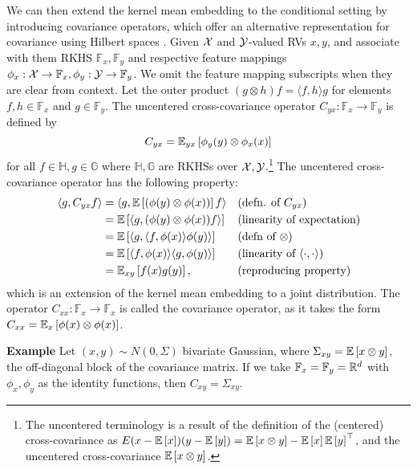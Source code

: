 \documentclass{article}
\begin{document}
We can then extend the kernel mean embedding to the conditional setting
by introducing covariance operators, which offer an alternative
representation for covariance using Hilbert spaces \citep{baker1970,baker1973}.
Given $\mathcal{X}$ and $\mathcal{Y}$-valued RVs $x,y$, and associate with them
RKHS $\mathbb{F}_x,\mathbb{F}_y$ and respective feature mappings
$\phi_x:\mathcal{X}\to\mathbb{F}_x,\phi_y:\mathcal{Y}\to\mathbb{F}_y$.
We omit the feature mapping subscripts when they are clear from context.
Let the outer product $(g \otimes h)f = \langle f,h\rangle g$ for elements
$f,h\in\mathbb{F}_x$ and $g\in\mathbb{F}_y$.
The uncentered cross-covariance operator $C_{yx}: \mathbb{F}_x\to\mathbb{F}_y$ is defined by
\begin{equation}
    \label{eqn:xcov}
    C_{yx} = \mathbb{E}_{yx}\left[\phi_y(y)\otimes\phi_x(x)\right]
\end{equation}
for all $f\in\mathbb{H},g\in\mathbb{G}$ where $\mathbb{H},\mathbb{G}$ are
RKHSs over $\mathcal{X},\mathcal{Y}$.\footnote{
The uncentered terminology is a result of the definition of the (centered) cross-covariance
as $E{(x - \mathbb{E}\left[x\right])(y - \mathbb{E}\left[y\right])} = \mathbb{E}\left[x\otimes y\right] - \mathbb{E}\left[x\right]\mathbb{E}\left[y\right]^\top$,
and the uncentered cross-covariance $\mathbb{E}\left[x\otimes y\right]$.
}
The uncentered cross-covariance operator has the following property:
\begin{equation}
    \label{eqn:xcove}
    \begin{aligned}
    \langle g, C_{yx}f\rangle
    &= \langle g, \mathbb{E}\left[(\phi(y)\otimes\phi(x))\right]f\rangle && \text{(defn. of }C_{yx})\\
    &= \mathbb{E}\left[\langle g, (\phi(y)\otimes\phi(x))f\rangle\right] && \text{(linearity of expectation)}\\
    &= \mathbb{E}\left[\langle g, \langle f, \phi(x)\rangle \phi(y)\rangle\right] && \text{(defn of }\otimes)\\
    &= \mathbb{E}\left[\langle f, \phi(x)\rangle\langle g, \phi(y)\rangle\right] && \text{(linearity of }\langle\cdot,\cdot\rangle)\\
    &= \mathbb{E}_{xy}\left[f(x)g(y)\right], && \text{(reproducing property)}
    \end{aligned}
\end{equation}
which is an extension of the kernel mean embedding to a joint distribution.
The operator $C_{xx}:\mathbb{F}_x\to\mathbb{F}_x$ is called the covariance operator,
as it takes the form $C_{xx} = \mathbb{E}_{x}\left[\phi(x)\otimes\phi(x)\right]$.

\textbf{Example}
Let $(x,y)\sim N(0,\Sigma)$ bivariate Gaussian,
where $\Sigma_{xy} = \mathbb{E}\left[x \otimes y\right]$, the off-diagonal
block of the covariance matrix.
If we take $\mathbb{F}_x=\mathbb{F}_y=\mathbb{R}^d$
with $\phi_x,\phi_y$ as the identity functions,
then $C_{xy} = \Sigma_{xy}$.
\end{document}
